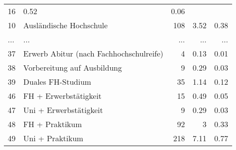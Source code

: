\begin{longtable}{lXrrr}
          \num{16} &
          \num[round-mode=places,round-precision=2]{0,52} &
          \num[round-mode=places,round-precision=2]{0,06} \\
        10 & \multicolumn{1}{X}{Ausländische Hochschule} & %
          \num{108} &
          \num[round-mode=places,round-precision=2]{3,52} &
          \num[round-mode=places,round-precision=2]{0,38} \\
       ... & ... & ... & ... & ... \\
        37 & \multicolumn{1}{X}{Erwerb Abitur (nach Fachhochschulreife)} & %
          \num{4} &
          \num[round-mode=places,round-precision=2]{0,13} &
          \num[round-mode=places,round-precision=2]{0,01} \\

        38 & \multicolumn{1}{X}{Vorbereitung auf Ausbildung} & %
          \num{9} &
          \num[round-mode=places,round-precision=2]{0,29} &
          \num[round-mode=places,round-precision=2]{0,03} \\

        39 & \multicolumn{1}{X}{Duales FH-Studium} & %
          \num{35} &
          \num[round-mode=places,round-precision=2]{1,14} &
          \num[round-mode=places,round-precision=2]{0,12} \\

        46 & \multicolumn{1}{X}{FH + Erwerbstätigkeit} & %
          \num{15} &
          \num[round-mode=places,round-precision=2]{0,49} &
          \num[round-mode=places,round-precision=2]{0,05} \\

        47 & \multicolumn{1}{X}{Uni + Erwerbstätigkeit} & %
          \num{9} &
          \num[round-mode=places,round-precision=2]{0,29} &
          \num[round-mode=places,round-precision=2]{0,03} \\

        48 & \multicolumn{1}{X}{FH + Praktikum} & %
          \num{92} &
          \num[round-mode=places,round-precision=2]{3} &
          \num[round-mode=places,round-precision=2]{0,33} \\

        49 & \multicolumn{1}{X}{Uni + Praktikum} & %
          \num{218} &
          \num[round-mode=places,round-precision=2]{7,11} &
          \num[round-mode=places,round-precision=2]{0,77} \\


\end{longtable}
